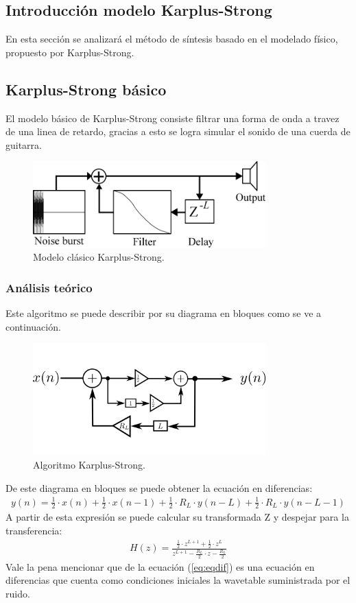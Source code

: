 



\subsection{Introducción modelo Karplus-Strong}
En esta sección se analizará el método de síntesis basado en el modelado físico, propuesto por Karplus-Strong.
\subsection{Karplus-Strong básico}
El modelo básico de Karplus-Strong consiste filtrar una forma de onda a travez de una linea de retardo, gracias a esto se logra simular el sonido de una cuerda de guitarra.
\begin{figure}[H]
	\centering
	\includegraphics[width=0.8\textwidth]{ImagenesEjercicio4/ksinit.PNG}
\caption{Modelo clásico Karplus-Strong.}
	\label{fig:kscl}
\end{figure}
\subsubsection{Análisis teórico}
Este algoritmo se puede describir por su diagrama en bloques como se ve  a continuación.
\begin{figure}[H]
	\centering
	\includegraphics[width=0.8\textwidth]{ImagenesEjercicio4/ksclasic.PNG}
\caption{Algoritmo Karplus-Strong.}
	\label{fig:ksclasico}
\end{figure}
De este diagrama en bloques se puede obtener la ecuación en diferencias:
\begin{align}
y(n) = \frac{1}{2}\cdot x(n) +\frac{1}{2}\cdot x(n-1) + \frac{1}{2}\cdot R_L \cdot y(n-L) + \frac{1}{2}\cdot R_L \cdot y(n-L-1) 
\label{eq:eqdif}
\end{align}
A partir de esta expresión se puede calcular su transformada Z y despejar para la transferencia:
\begin{align}
H(z) = \frac{\frac{1}{2} \cdot z^{L+1} +\frac{1}{2} \cdot z^{L} }{z^{L+1} - \frac{R_L}{2} \cdot z - \frac{R_L}{2}}
\label{eq:hzks}
\end{align}  
Vale la pena mencionar que de la ecuación (\ref{eq:eqdif}) es una ecuación en diferencias que cuenta como condiciones iniciales la wavetable suministrada por el ruido.
